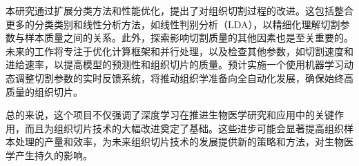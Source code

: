 本研究通过扩展分类方法和性能优化，提出了对组织切割过程的改进。这包括整合更多的分类类别和线性分析方法，如线性判别分析（LDA），以精细化理解切割参数与样本质量之间的关系。此外，探索影响切割质量的其他因素也是至关重要的。未来的工作将专注于优化计算框架和并行处理，以及检查其他参数，如切割速度和进给速率，以提高模型的预测性和组织切片的质量。预计实施一个使用机器学习动态调整切割参数的实时反馈系统，将推动组织学准备向全自动化发展，确保始终高质量的组织切片。

总的来说，这个项目不仅强调了深度学习在推进生物医学研究和应用中的关键作用，而且为组织切片技术的大幅改进奠定了基础。这些进步可能会显著提高组织样本处理的产量和效率，为未来组织切片技术的发展提供新的策略和方法，对生物医学产生持久的影响。



\FloatBarrier %